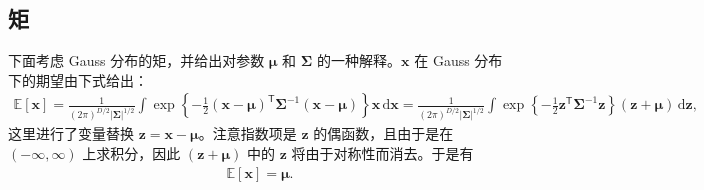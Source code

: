 \documentclass[../../main.tex]{subfiles}
\begin{document}
\subsection{矩}\label{subsection:ch03-矩}

下面考虑 Gauss 分布的矩，并给出对参数 $\boldsymbol{\mu}$ 和 $\boldsymbol{\Sigma}$ 的一种解释。$\boldsymbol{x}$ 在 Gauss 分布下的期望由下式给出：
\begin{align}
\mathbb{E}[\boldsymbol{x}]=\frac{1}{(2\pi)^{D/2}\lvert\boldsymbol{\Sigma}\rvert^{1/2}}\int\exp\left\{-\frac{1}{2}(\boldsymbol{x}-\boldsymbol{\mu})^{\mathsf{T}}\boldsymbol{\Sigma}^{-1}(\boldsymbol{x}-\boldsymbol{\mu})\right\}\boldsymbol{x}\,\mathrm{d}\boldsymbol{x}
=\frac{1}{(2\pi)^{D/2}\lvert\boldsymbol{\Sigma}\rvert^{1/2}}\int\exp\left\{-\frac{1}{2}\boldsymbol{z}^{\mathsf{T}}\boldsymbol{\Sigma}^{-1}\boldsymbol{z}\right\}(\boldsymbol{z}+\boldsymbol{\mu})\,\mathrm{d}\boldsymbol{z},
\label{align:ch03-Gauss均值期望}
\end{align}
这里进行了变量替换 $\boldsymbol{z}=\boldsymbol{x}-\boldsymbol{\mu}$。注意指数项是 $\boldsymbol{z}$ 的偶函数，且由于是在 $(-\infty,\infty)$ 上求积分，因此 $(\boldsymbol{z}+\boldsymbol{\mu})$ 中的 $\boldsymbol{z}$ 将由于对称性而消去。于是有
\begin{align}
\mathbb{E}[\boldsymbol{x}]=\boldsymbol{\mu}.
\label{align:ch03-Gauss均值}
\end{align}
\end{document}

